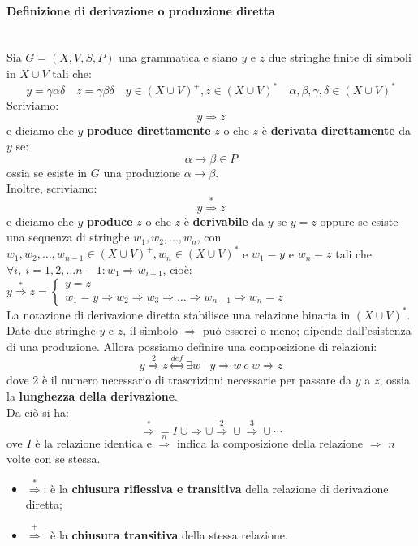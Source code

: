 \documentclass[12pt]{report}
\begin{document}
	\paragraph{Definizione di derivazione o produzione diretta} \quad \\
	Sia $G = (X, V, S, P)$ una grammatica e siano $y$ e $z$ due stringhe finite di simboli in $X \cup V$ tali che:
	\[
	y=\gamma\alpha\delta \quad z=\gamma\beta\delta \quad y \in (X \cup V)^+, z \in (X \cup V)^* \quad \alpha,\beta,\gamma,\delta \in (X \cup V)^*
	\]
	Scriviamo:
	\[
	y \Rightarrow z
	\]
	e diciamo che $y$ \textbf{produce direttamente} $z$ o che $z$ è \textbf{derivata direttamente} da $y$ se:
	\[
	\alpha \to \beta \in P
	\]
	ossia se esiste in $G$ una produzione $\alpha \to \beta$. \\
	Inoltre, scriviamo:
	\[
	y \overset{*}{\Rightarrow} z
	\]
	e diciamo che $y$ \textbf{produce} $z$ o che $z$ è \textbf{derivabile} da $y$ se $y=z$ oppure se esiste una sequenza di stringhe $w_1, w_2, \dots, w_n$, con $w_1, w_2, \dots, w_{n-1} \in (X \cup V)^+, w_n \in (X \cup V)^*$ e $w_1= y$  e $w_n=z$ tali che $\forall i,\ i = 1, 2, \dots n-1: w_1 \Rightarrow w_{i+1}$, cioè: \\
	$y \overset{*}{\Rightarrow} z = \begin{cases}
		y = z \\
		w_1 = y \Rightarrow w_2 \Rightarrow w_3 \Rightarrow \dots \Rightarrow w_{n-1} \Rightarrow w_n = z
	\end{cases}$ \\
	La notazione di derivazione diretta stabilisce una relazione binaria in $(X \cup V)^*$. Date due stringhe $y$ e $z$, il simbolo $\Rightarrow$ può esserci o meno; dipende dall'esistenza di una produzione. Allora possiamo definire una composizione di relazioni:
	\[
	y \overset{2}{\Rightarrow} z \overset{def}{\iff} \exists w \mid y \Rightarrow w\ e\ w \Rightarrow z
	\]
	dove 2 è il numero necessario di trascrizioni necessarie per passare da $y$ a $z$, ossia la \textbf{lunghezza della derivazione}. \\
	Da ciò si ha:
	\[
	\overset{*}{\Rightarrow} = I\ \cup \Rightarrow \cup \overset{2}{\Rightarrow} \cup \overset{3}{\Rightarrow} \cup \cdots
	\]
	ove $I$ è la relazione identica e $\overset{n}{\Rightarrow}$ indica la composizione della relazione $\Rightarrow$ $n$ volte con se stessa.
	\begin{itemize}
		\item $\overset{*}{\Rightarrow}$: è la \textbf{chiusura riflessiva e transitiva} della relazione di derivazione diretta;
		\item $\overset{+}{\Rightarrow}$: è la \textbf{chiusura transitiva} della stessa relazione.
	\end{itemize}
\end{document}

